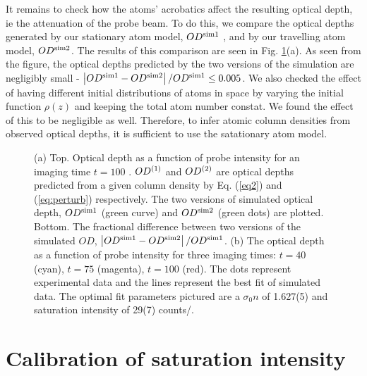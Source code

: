 It remains to check how the atoms' acrobatics affect the resulting optical depth, ie the attenuation of the probe beam. To do this, we compare the optical depths generated by our stationary atom model,  $OD^{\rm{sim1}}$ , and by our travelling atom model, $OD^{\rm{sim2}}$. The results of this comparison are seen in Fig. \ref{fig:compareModelsAndIsat}(a). As seen from the figure, the optical depths predicted by the two versions of the simulation are negligibly small -  $\left|OD^{\rm{sim1}}-OD^{\rm{sim2}}\right|/OD^{\rm{sim1}} \le 0.005$. We also checked the effect of having different initial distributions of atoms in space by varying the initial function $\rho(z)$ and keeping the total atom number constat. We found the effect of this to be negligible as well. Therefore, to infer atomic column densities from observed optical depths, it is sufficient to use the satationary atom model.



\begin{figure}
\caption[Comparison of stationary and moving atom simulations]{(a) Top. Optical depth as a function of probe intensity for an imaging time $t=100$ \us. $OD^{\rm{(1)}}$ and $OD^{\rm{(2)}}$ are optical depths predicted from a given column density by Eq. (\ref{eq2}) and (\ref{eq:perturb}) respectively.  The two versions of simulated optical depth, $OD^{\rm{sim1}}$ (green curve) and $OD^{\rm{sim2}}$ (green dots) are plotted. Bottom. The fractional difference between two versions of the simulated $OD$, $\left|OD^{\rm{sim1}}-OD^{\rm{sim2}}\right|/OD^{\rm{sim1}}$. (b) The optical depth as a function of probe intensity for three imaging times: $t=40$ \us{} (cyan),  $t=75$ \us{} (magenta),  $t=100$ \us{} (red). The dots represent experimental data and the lines represent the best fit of simulated data. The optimal fit parameters pictured are a $\sigma_0 n$ of 1.627(5) and saturation intensity of 29(7) counts/\us{}.}
\label{fig:compareModelsAndIsat}
\end{figure}


\section{Calibration of saturation intensity}

